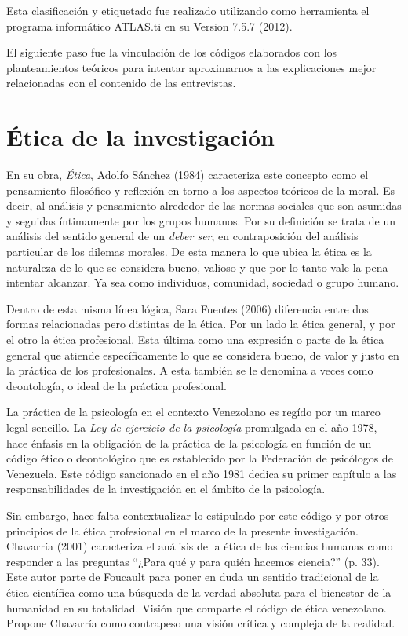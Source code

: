 Esta clasificación y etiquetado fue realizado utilizando como herramienta el
programa informático ATLAS.ti en su Version 7.5.7 (2012).

El siguiente paso fue la vinculación de los códigos elaborados con los
planteamientos teóricos para intentar aproximarnos a las explicaciones mejor
relacionadas con el contenido de las entrevistas.

\section{Ética de la investigación}

En su obra, \emph{Ética}, Adolfo Sánchez (1984) caracteriza este
concepto como el pensamiento filosófico y reflexión en torno a los aspectos
teóricos de la moral.
Es decir, al análisis y pensamiento alrededor de las normas sociales que son
asumidas y seguidas íntimamente por los grupos humanos.
Por su definición se trata de un análisis del sentido general de un
\emph{deber ser}, en contraposición del análisis particular de los dilemas
morales.
De esta manera lo que ubica la ética es la naturaleza de lo que se considera
bueno, valioso y que por lo tanto vale la pena intentar alcanzar.
Ya sea como individuos, comunidad, sociedad o grupo humano.

Dentro de esta misma línea lógica, Sara Fuentes (2006) diferencia entre dos
formas relacionadas pero distintas de la ética.
Por un lado la ética general, y por el otro la ética profesional.
Esta última como una expresión o parte de la ética general que atiende
específicamente lo que se considera bueno, de valor y justo en la práctica de
los profesionales.
A esta también se le denomina a veces como deontología, o ideal de la
práctica profesional.

La práctica de la psicología en el contexto Venezolano es regído por un marco
legal sencillo.
La \emph{Ley de ejercicio de la psicología} promulgada en el año 1978, hace
énfasis en la obligación de la práctica de la psicología en función de un
código ético o deontológico que es establecido por la Federación de
psicólogos de Venezuela.
Este código sancionado en el año 1981 dedica su primer capítulo a las
responsabilidades de la investigación en el ámbito de la psicología.

Sin embargo, hace falta contextualizar lo estipulado por este código y por
otros principios de la ética profesional en el marco de la presente
investigación.
Chavarría (2001) caracteriza el análisis de la ética de las ciencias humanas
como responder a las preguntas “¿Para qué y para quién hacemos ciencia?” (p.
33).
Este autor parte de Foucault para poner en duda un sentido tradicional de la
ética científica como una búsqueda de la verdad absoluta para el bienestar de
la humanidad en su totalidad.
Visión que comparte el código de ética venezolano.
Propone Chavarría como contrapeso una visión crítica y compleja de la
realidad.

